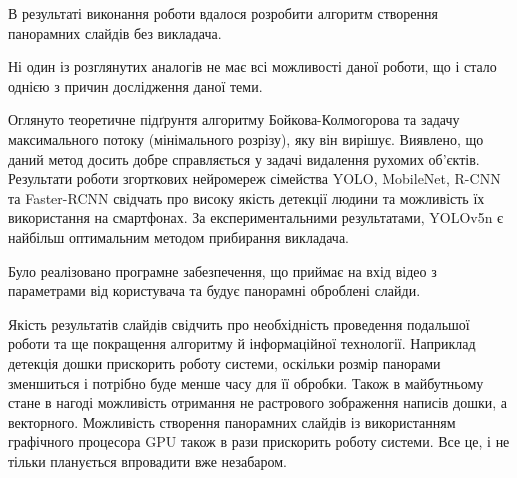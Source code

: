 В результаті виконання роботи вдалося
розробити алгоритм створення панорамних слайдів без викладача.


Ні один із розглянутих аналогів не має всі можливості даної роботи, що і стало однією
з причин дослідження даної теми.


Оглянуто теоретичне підґрунтя алгоритму Бойкова-Колмогорова та задачу
максимального потоку (мінімального розрізу), яку він вирішує. Виявлено, що
даний метод досить добре справляється у задачі видалення рухомих об'єктів.
Результати роботи згорткових нейромереж сімейства YOLO, MobileNet, R-CNN та
Faster-RCNN свідчать про високу якість детекції людини та можливість
їх використання на смартфонах. За експериментальними результатами, YOLOv5n є найбільш оптимальним
методом прибирання викладача.


Було реалізовано програмне забезпечення,
що приймає на вхід відео з параметрами від користувача та
будує панорамні оброблені слайди.


Якість результатів слайдів свідчить про необхідність проведення подальшої роботи та
ще покращення алгоритму й інформаційної технології. Наприклад детекція дошки прискорить
роботу системи, оскільки розмір панорами зменшиться і потрібно буде менше часу для її обробки.
Також в майбутньому стане в нагоді можливість отримання не растрового зображення написів дошки, а
векторного. Можливість створення панорамних слайдів із використанням графічного процесора GPU також 
в рази прискорить роботу системи. Все це, і не тільки планується впровадити вже незабаром.
\clearpage